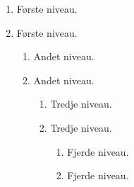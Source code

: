 \documentclass[class=report, crop=false]{standalone}
\begin{document}
    \begin{tcblisting}{}
        \begin{enumerate}
            \item Første niveau.
            \item Første niveau.
            \begin{enumerate}
                \item Andet niveau.
                \item Andet niveau.
                \begin{enumerate}
                    \item Tredje niveau.
                    \item Tredje niveau.
                    \begin{enumerate}
                        \item Fjerde niveau.
                        \item Fjerde niveau.
                    \end{enumerate}
                \end{enumerate}
            \end{enumerate}
        \end{enumerate}
    \end{tcblisting}
\end{document}
